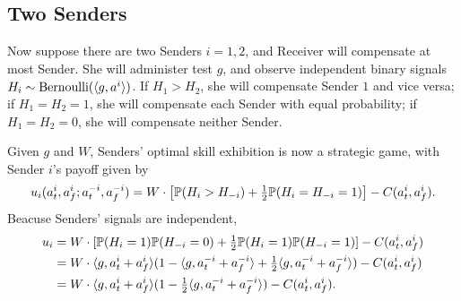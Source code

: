 \subsection{Two Senders}

Now suppose there are two Senders $i=1,2$, and Receiver will compensate at most Sender. She will administer test $g$, and observe independent binary signals $H_i \sim \text{Bernoulli}(\langle g,a^i\rangle)$. If $H_1>H_2$, she will compensate Sender $1$ and vice versa; if $H_1=H_2=1$, she will compensate each Sender with equal probability; if $H_1=H_2=0$, she will compensate neither Sender.

Given $g$ and $W$, Senders' optimal skill exhibition is now a strategic game, with Sender $i$'s payoff given by $$u_i(a_t^i,a_f^i; a_t^{-i}, a_f^{-i})=W \cdot \left[\mathbb{P}(H_i>H_{-i})+\tfrac 1 2\mathbb{P}(H_i=H_{-i}=1)\right]-C(a_t^i,a_f^i).$$ Beacuse Senders' signals are independent, \begin{align*}u_i&=W \cdot [\mathbb{P}(H_i=1)\mathbb{P}(H_{-i}=0)+\tfrac 1 2 \mathbb{P}(H_i=1)\mathbb{P}(H_{-i}=1)] - C(a_t^i,a_f^i)\\
&=W \cdot \langle g,a_t^i+a_f^i\rangle(1-\langle g,a_t^{-i}+a_f^{-i}\rangle+\tfrac 1 2\langle g,a_t^{-i}+a_f^{-i}\rangle)-C(a_t^i,a_f^i)\\
&=W \cdot \langle g,a_{t}^i+a_f^i\rangle(1-\tfrac 1 2\langle g,a_t^{-i}+a_f^{-i}\rangle)-C(a_t^i,a_f^i).\end{align*}

